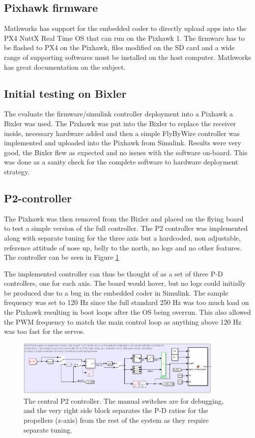 \documentclass{article}
\begin{document}

\subsection{Pixhawk firmware}
Mathworks has support for the embedded coder to directly upload apps into the PX4 NuttX Real Time OS that can run on the Pixhawk 1.
The firmware has to be flashed to PX4 on the Pixhawk, files modified on the SD card and a wide range of supporting softwares must be installed on the host computer.
Mathworks has great documentation on the subject.\cite{MathworksPX4}

\subsection{Initial testing on Bixler}
The evaluate the firmware/simulink controller deployment into a Pixhawk a Bixler was used.
The Pixhawk was put into the Bixler to replace the receiver inside, necessary hardware added and then a simple FlyByWire controller was implemented and uploaded into the Pixhawk from Simulink.
Results were very good, the Bixler flew as expected and no issues with the software on-board.
This was done as a sanity check for the complete software to hardware deployment strategy.


\subsection{P2-controller}
The Pixhawk was then removed from the Bixler and placed on the flying board to test a simple version of the full controller.
The P2 controller \cite{P2} was implemented along with separate tuning for the three axis but a hardcoded, non adjustable, reference attitude of nose up, belly to the north, no logs and no other features.
The controller can be seen in Figure \ref{fig:P2_simulink}

The implemented controller can thus be thought of as a set of three P-D controllers, one for each axis.
The board would hover, but no logs could initially be produced due to a bug in the embedded coder in Simulink.
The sample frequency was set to 120 Hz since the full standard 250 Hz was too much load on the Pixhawk resulting in boot loops after the OS being overrun.
This also allowed the PWM frequency to match the main control loop as anything above 120 Hz was too fast for the servos.

\begin{figure}
    \center
    \includegraphics[width=0.9\textwidth]{P2.PNG}
    \caption{The central P2 controller. The manual switches are for debugging, and the very right side block separates the P-D ratios for the propellers (z-axis) from the rest of the system as they require separate tuning.}
    \label{fig:P2_simulink}
\end{figure}
\end{document}
